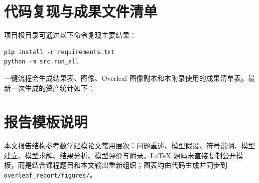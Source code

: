 \documentclass{article}
\begin{document}



\appendix
\section{代码复现与成果文件清单}
项目根目录可通过以下命令复现主要结果：
\begin{verbatim}
pip install -r requirements.txt
python -m src.run_all
\end{verbatim}
一键流程会生成结果表、图像、Overleaf 图像副本和本附录使用的成果清单表。最新一次生成的资产统计如下：

\begin{center}

\end{center}

\section{报告模板说明}
本文报告结构参考数学建模论文常用层次：问题重述、模型假设、符号说明、模型建立、模型求解、结果分析、模型评价与附录。LaTeX 源码未直接复制公开模板，而是结合课程题目和本文输出重新组织；图表均由代码生成并同步到 \texttt{overleaf\_report/figures/}。
\end{document}
